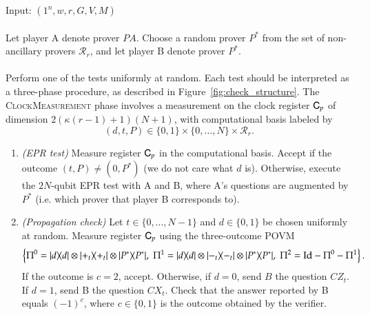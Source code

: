 \vspace{10pt}
\begin{center}
\begin{mdframed}
    Input: $(1^n,w,r,G,V,M)$ \\
    \\
	Let player A denote prover $PA$.
    Choose a random prover $P^*$ from the set of non-ancillary provers $\mathcal{R}_r$, and let player B denote prover $P^*$. \\
    \\
    Perform one of the tests uniformly at random. Each test should be interpreted as a three-phase procedure, as described in Figure~\ref{fig:check_structure}.  The \textsc{ClockMeasurement} phase involves a measurement on the clock register ${\textsf{C}}_p$ of dimension $2(\kappa(r-1)+1)(N+1)$, with computational basis labeled by 
    \[
    (d,t,P)\in \{0,1\}\times \{0,\ldots,N\} \times \mathcal{R}_r .
    \]
    
	\begin{enumerate}
 \item \emph{(EPR test)} Measure register ${\textsf{C}}_{p}$ in the computational basis. Accept if the outcome $(t,P)\neq (0,P^*)$ (we do not care what $d$ is). Otherwise, execute the $2N$-qubit EPR test with A and B, where A's questions are augmented by $P^*$ (i.e. which prover that player B corresponds to). \\

\item \emph{(Propagation check)} Let $t\in\{0,\ldots,N-1\}$ and $d\in\{0,1\}$ be chosen uniformly at random. Measure register ${\textsf{C}}_{p}$ using the three-outcome POVM
$$\left\{ \Pi^0 = |d\rangle\!\langle d| \otimes |+_t\rangle\!\langle+_t| \otimes |P^*\rangle\!\langle P^*|,\; \Pi^1 =  |d\rangle\!\langle d| \otimes |-_t\rangle\!\langle-_t| \otimes |P^*\rangle\!\langle P^*|,\;\Pi^2 = \mathop{\mathrm{Id}}\!\mathinner{} - \Pi^0-\Pi^1 \right\}.$$
If the outcome is $c=2$, accept. Otherwise, if $d=0$, send $B$ the question $CZ_{t}$. If $d=1$, send B the question $CX_t$. Check that the answer reported by B equals $(-1)^c$, where $c\in\{0,1\}$ is the outcome obtained by the verifier.\\


\end{enumerate}
\end{mdframed}
\end{center}
